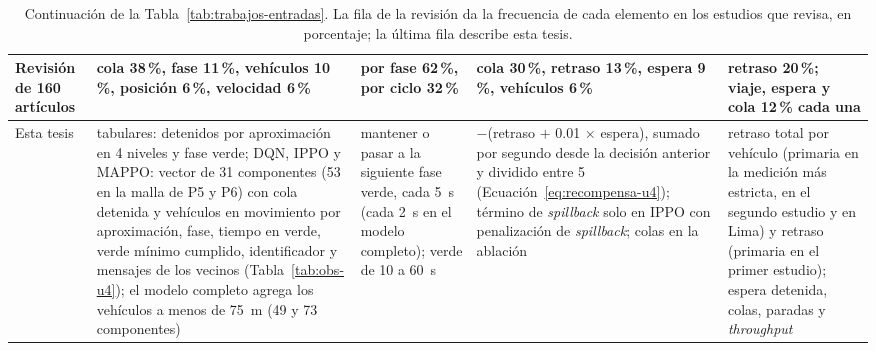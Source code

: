 \begin{table}[H]
\begin{tabular}{>{\raggedright\arraybackslash}p{2.0cm}>{\raggedright\arraybackslash}p{3.8cm}>{\raggedright\arraybackslash}p{2.4cm}>{\raggedright\arraybackslash}p{2.4cm}>{\raggedright\arraybackslash}p{1.8cm}}
Revisión de 160 artículos \citep{Noaeen2022_SLR}
  & cola 38\,\%, fase 11\,\%, vehículos 10\,\%, posición 6\,\%, velocidad 6\,\%
  & por fase 62\,\%, por ciclo 32\,\%
  & cola 30\,\%, retraso 13\,\%, espera 9\,\%, vehículos 6\,\%
  & retraso 20\,\%; viaje, espera y cola 12\,\% cada una \\
\midrule
Esta tesis
  & tabulares: detenidos por aproximación en 4 niveles y fase verde; DQN, IPPO y MAPPO: vector de 31 componentes (53 en la malla de P5 y P6) con cola detenida y vehículos en movimiento por aproximación, fase, tiempo en verde, verde mínimo cumplido, identificador y mensajes de los vecinos (Tabla~\ref{tab:obs-u4}); el modelo completo agrega los vehículos a menos de 75~m (49 y 73 componentes)
  & mantener o pasar a la siguiente fase verde, cada 5~s (cada 2~s en el modelo completo); verde de 10 a 60~s
  & $-$(retraso $+$ 0.01 $\times$ espera), sumado por segundo desde la decisión anterior y dividido entre 5 (Ecuación~\ref{eq:recompensa-u4}); término de \textit{spillback} solo en IPPO con penalización de \textit{spillback}; colas en la ablación
  & retraso total por vehículo (primaria en la medición más estricta, en el segundo estudio y en Lima) y retraso (primaria en el primer estudio); espera detenida, colas, paradas y \textit{throughput} \\
\bottomrule
\end{tabular}
\caption[Formulación de los trabajos con aprendizaje por refuerzo (continuación)]{Continuación de la Tabla~\ref{tab:trabajos-entradas}. La fila de la revisión da la frecuencia de cada elemento en los estudios que revisa, en porcentaje; la última fila describe esta tesis.}
\label{tab:trabajos-entradas-3}
\end{table}

